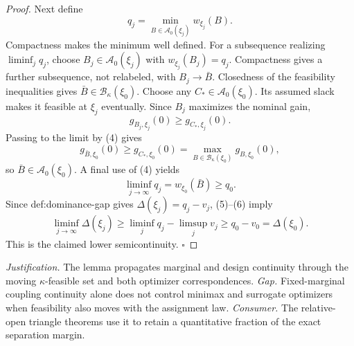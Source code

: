 \documentclass{article}
\begin{document}
\begin{proof}
Next define
\[
q_j=\min_{B\in\mathcal A_0(\xi_j)}w_{\xi_j}(B).
\]
Compactness makes the minimum well defined.  For a subsequence realizing \(\liminf_jq_j\), choose \(B_j\in\mathcal A_0(\xi_j)\) with \(w_{\xi_j}(B_j)=q_j\).  Compactness gives a further subsequence, not relabeled, with \(B_j\to\bar B\).  Closedness of the feasibility inequalities gives \(\bar B\in\mathcal B_\kappa(\xi_0)\).  Choose any \(C_*\in\mathcal A_0(\xi_0)\).  Its assumed slack makes it feasible at \(\xi_j\) eventually.  Since \(B_j\) maximizes the nominal gain,
\[
g_{B_j,\xi_j}(0)\ge g_{C_*,\xi_j}(0).
\]
Passing to the limit by (4) gives
\[
g_{\bar B,\xi_0}(0)\ge g_{C_*,\xi_0}(0)
=\max_{B\in\mathcal B_\kappa(\xi_0)}g_{B,\xi_0}(0),
\]
so \(\bar B\in\mathcal A_0(\xi_0)\).  A final use of (4) yields
\[
\liminf_{j\to\infty}q_j
=w_{\xi_0}(\bar B)
\ge q_0.
\tag{6}
\]
Since def:dominance-gap gives \(\Delta(\xi_j)=q_j-v_j\), (5)--(6) imply
\[
\liminf_{j\to\infty}\Delta(\xi_j)
\ge\liminf_jq_j-\limsup_jv_j
\ge q_0-v_0
=\Delta(\xi_0).
\]
This is the claimed lower semicontinuity.  \(\square\)
\end{proof}
\par\smallskip\noindent \textit{Justification.} The lemma propagates marginal and design continuity through the moving \(\kappa\)-feasible set and both optimizer correspondences. \textit{Gap.} Fixed-marginal coupling continuity alone does not control minimax and surrogate optimizers when feasibility also moves with the assignment law. \textit{Consumer.} The relative-open triangle theorems use it to retain a quantitative fraction of the exact separation margin.
\end{document}
